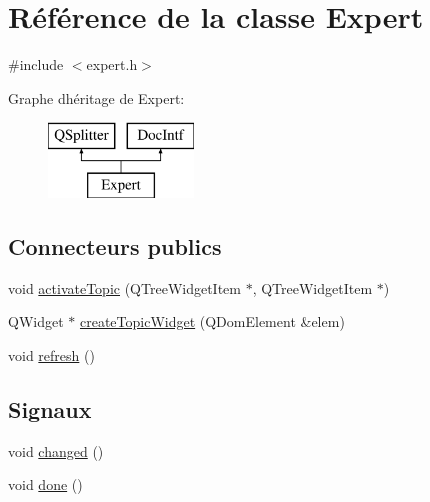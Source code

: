 \hypertarget{class_expert}{}\section{Référence de la classe Expert}
\label{class_expert}


{\ttfamily \#include $<$expert.\+h$>$}

Graphe d\textquotesingle{}héritage de Expert\+:\begin{figure}[H]
\begin{center}
\leavevmode
\includegraphics[height=2.000000cm]{class_expert}
\end{center}
\end{figure}
\subsection*{Connecteurs publics}
\begin{DoxyCompactItemize}
\item 
void \hyperlink{class_expert_a0f55cd028a8322d2d1f8afee0febe967}{activate\+Topic} (Q\+Tree\+Widget\+Item $\ast$, Q\+Tree\+Widget\+Item $\ast$)
\item 
Q\+Widget $\ast$ \hyperlink{class_expert_a0c1669551833b56baf5241b1fe7b60ab}{create\+Topic\+Widget} (Q\+Dom\+Element \&elem)
\item 
void \hyperlink{class_expert_a9d7ae3fd40cb983dbfda644207b252c0}{refresh} ()
\end{DoxyCompactItemize}
\subsection*{Signaux}
\begin{DoxyCompactItemize}
\item 
void \hyperlink{class_expert_adfdb3f64dfe39f00c6454db2763cdca3}{changed} ()
\item 
void \hyperlink{class_expert_a4e4cb0780efed37a18d12610af419f67}{done} ()
\end{DoxyCompactItemize}
